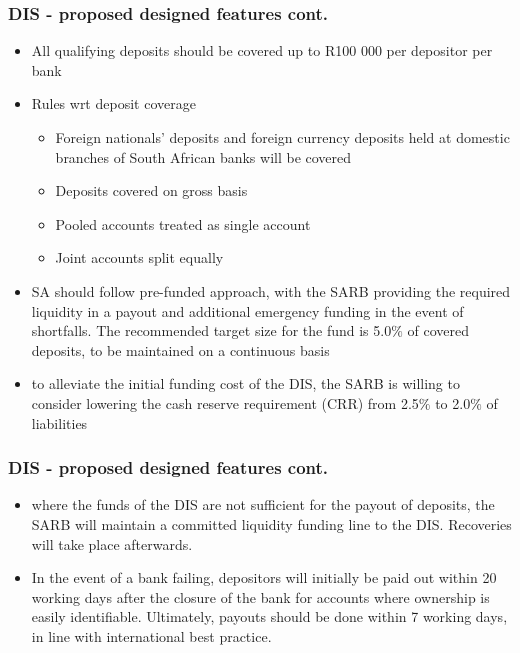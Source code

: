 \documentclass[11pt]{beamer}
\begin{document}
\begin{frame}
\frametitle{DIS - proposed designed features cont.}
\begin{itemize}
\item All qualifying deposits should be covered up to R100 000 per depositor per bank
\item Rules wrt deposit coverage
\begin{itemize}
\item Foreign nationals’ deposits and foreign currency deposits held at domestic
branches of South African banks will be covered
\item Deposits covered on gross basis
\item Pooled accounts treated as single account
\item Joint accounts split equally
\end{itemize}
\item SA should follow pre-funded approach, with the SARB providing the required liquidity in a payout and additional emergency funding in the event of shortfalls. The recommended target size for the fund is 5.0$\%$ of covered deposits, to be maintained on a continuous basis
\item to alleviate the initial funding cost of the DIS, the SARB is willing to consider lowering the cash reserve requirement (CRR) from 2.5$\%$ to 2.0$\%$ of liabilities
\end{itemize}
\end{frame}

\begin{frame}
\frametitle{DIS - proposed designed features cont.}
\begin{itemize}

\item where the funds of the DIS are not sufficient for the payout of deposits, the SARB will maintain a committed liquidity funding line to the DIS. Recoveries will take place afterwards.
\item In the event of a bank failing, depositors will initially be paid out within 20 working days after the closure of the bank for accounts where ownership is easily identifiable. Ultimately, payouts should be done within 7 working days, in
line with international best practice.
\end{itemize}
\end{frame}






\end{document}
